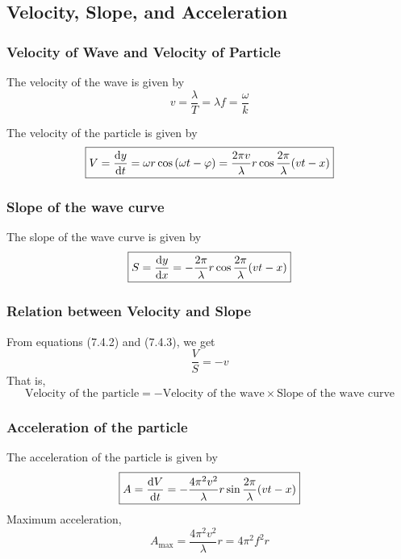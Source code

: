 \documentclass[12pt]{article}
\numberwithin{equation}{subsection}
\begin{document}
\subsection{Velocity, Slope, and Acceleration}
\subsubsection{Velocity of Wave and Velocity of Particle}
The velocity of the wave is given by
\begin{equation}
    \boxed{ v = \frac{\lambda}{T} = \lambda f = \frac{\omega}{k} }
\end{equation}

The velocity of the particle is given by
\begin{equation}
    \boxed{ V = \dv{y}{t} = \omega r \cos{(\omega t - \varphi)} = \frac{2\pi v}{\lambda} r \cos{\frac{2\pi}{\lambda}(vt - x)}}
\end{equation}

\subsubsection{Slope of the wave curve}
The slope of the wave curve is given by
\begin{equation}
    \boxed{ S = \dv{y}{x} = - \frac{2\pi}{\lambda} r \cos{\frac{2\pi}{\lambda}(vt - x)} }
\end{equation}

\subsubsection{Relation between Velocity and Slope}
From equations (7.4.2) and (7.4.3), we get
\begin{equation}
    \boxed{ \frac{V}{S} = -v }
\end{equation}
That is, \\
\begin{equation*}
    \boxed{ \text{Velocity of the particle} = - \text{Velocity of the wave} \times \text{Slope of the wave curve} }
\end{equation*}

\subsubsection{Acceleration of the particle}
The acceleration of the particle is given by
\begin{equation}
    \boxed{ A = \dv{V}{t} = - \frac{4\pi^2 v^2}{\lambda} r \sin{\frac{2\pi}{\lambda}(vt - x)} }
\end{equation}
Maximum acceleration,
\begin{equation}
    A_{\text{max}} = \frac{4\pi^2 v^2}{\lambda} r = 4\pi^2 f^2 r
\end{equation}
\end{document}

